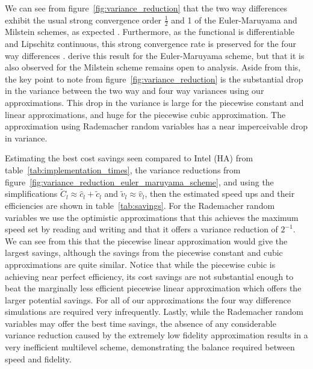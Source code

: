 \documentclass[manuscript,review]{acmart}
\begin{document}
We can see from figure~\ref{fig:variance_reduction} that the two way differences exhibit the usual strong convergence order $ \tfrac{1}{2} $ and 1 of the Euler-Maruyama and Milstein schemes, as expected \citep{kloeden1999numerical}. Furthermore, as the functional is differentiable and Lipschitz continuous, this strong convergence rate is preserved for the four way differences \citep{giles2020approximate,sheridan2020nested}. \citeauthor{giles2020approximate} \citep{giles2020approximate,sheridan2020nested} derive this result for the Euler-Maruyama scheme, but that it is also observed for the Milstein scheme remains open to analysis. Aside from this, the key point to note from figure~\ref{fig:variance_reduction} is the substantial drop in the variance between the two way and four way variances using our approximations. This drop in the variance is large for the piecewise constant and linear approximations, and huge for the piecewise cubic approximation. The approximation using Rademacher random variables has a near imperceivable drop in variance. 

Estimating the best cost savings seen compared to Intel (HA) from table~\ref{tab:implementation_times}, the variance reductions from figure~\ref{fig:variance_reduction_euler_maruyama_scheme}, and using the simplifications $ \widetilde{C}_l \approx \hat{c}_l + \tilde{c}_l $ and $ \tilde{v}_l \approx  \hat{v}_l $, then the estimated speed ups and their efficiencies are shown in table~\ref{tab:savings}. For the Rademacher random variables we use the optimistic  approximations that this achieves the maximum speed set by reading and writing and that it offers a variance reduction of $ 2^{-1} $. We can see from this that the piecewise linear approximation would give the largest savings, although the savings from the piecewise constant and cubic approximations are quite similar. Notice that while the piecewise cubic is achieving near perfect efficiency, its cost savings are not substantial enough to beat the marginally less efficient piecewise linear approximation which offers the larger potential savings. For all of our approximations the four way difference simulations are required very infrequently. Lastly, while the Rademacher random variables may offer the best time savings, the absence of any considerable variance reduction caused by the extremely low fidelity approximation results in a very inefficient multilevel scheme, demonstrating the balance required between speed and fidelity. 
\end{document}
